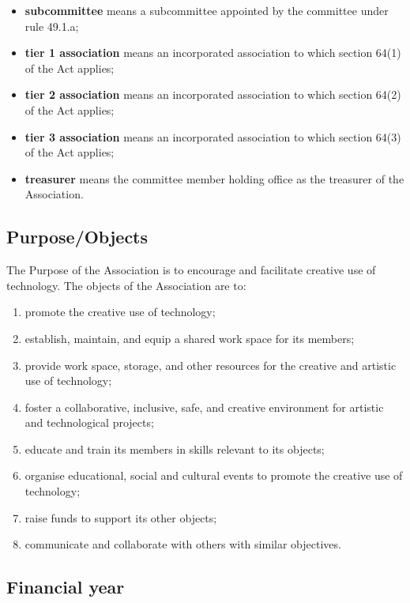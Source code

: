 \documentclass[../constitution.tex]{subfiles}
\begin{document}
\begin{itemize}[label={-}]
\item \textbf{subcommittee} means a subcommittee appointed by the committee under rule 49.1.a;
\item \textbf{tier 1 association} means an incorporated association to which section 64(1) of the Act applies;
\item \textbf{tier 2 association} means an incorporated association to which section 64(2) of the Act applies;
\item \textbf{tier 3 association} means an incorporated association to which section 64(3) of the Act applies;
\item \textbf{treasurer} means the committee member holding office as the treasurer of the Association.
\end{itemize}

\subsection{Purpose/Objects}\label{purposeobjects}

The Purpose of the Association is to encourage and facilitate creative use of technology. The objects of the Association are to:

\begin{enumerate}

\item promote the creative use of technology;
\item establish, maintain, and equip a shared work space for its members;
\item provide work space, storage, and other resources for the creative and artistic use of technology;
\item foster a collaborative, inclusive, safe, and creative environment for artistic and technological projects;
\item educate and train its members in skills relevant to its objects;
\item organise educational, social and cultural events to promote the creative use of technology;
\item raise funds to support its other objects;
\item communicate and collaborate with others with similar objectives.
\end{enumerate}

\subsection{Financial year} \label{financial-year}
\end{document}
